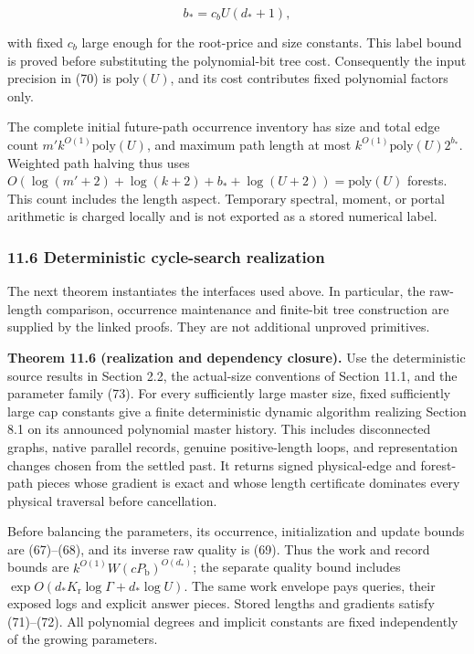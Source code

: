 \[
b_*=c_b U(d_*+1),
 \tag{72}
\]

with fixed \(c_b\) large enough for the root-price and size constants. This label bound is proved before substituting the polynomial-bit tree cost. Consequently the input precision in (70) is \(\mathrm{poly}(U)\), and its cost contributes fixed polynomial factors only.

The complete initial future-path occurrence inventory has size and total edge count \(m'k^{O(1)}\mathrm{poly}(U)\), and maximum path length at most \(k^{O(1)}\mathrm{poly}(U)2^{b_*}\). Weighted path halving thus uses \(O(\log(m'+2)+\log(k+2)+b_*+\log(U+2))=\mathrm{poly}(U)\) forests. This count includes the length aspect. Temporary spectral, moment, or portal arithmetic is charged locally and is not exported as a stored numerical label.

\hypertarget{af-46593eb93e-deterministic-cycle-search-realization}{%
\subsubsection{11.6 Deterministic cycle-search realization}\label{af-46593eb93e-deterministic-cycle-search-realization}}

The next theorem instantiates the interfaces used above. In particular, the raw-length comparison, occurrence maintenance and finite-bit tree construction are supplied by the linked proofs. They are not additional unproved primitives.

\textbf{Theorem 11.6 (realization and dependency closure).} Use the deterministic source results in Section 2.2, the actual-size conventions of Section 11.1, and the parameter family (73). For every sufficiently large master size, fixed sufficiently large cap constants give a finite deterministic dynamic algorithm realizing Section 8.1 on its announced polynomial master history. This includes disconnected graphs, native parallel records, genuine positive-length loops, and representation changes chosen from the settled past. It returns signed physical-edge and forest-path pieces whose gradient is exact and whose length certificate dominates every physical traversal before cancellation.

Before balancing the parameters, its occurrence, initialization and update bounds are (67)--(68), and its inverse raw quality is (69). Thus the work and record bounds are \(k^{O(1)}W(cP_{\mathrm b})^{O(d_*)}\); the separate quality bound includes \(\exp O(d_*K_{\mathrm r}\log\Gamma+d_*\log U)\). The same work envelope pays queries, their exposed logs and explicit answer pieces. Stored lengths and gradients satisfy (71)--(72). All polynomial degrees and implicit constants are fixed independently of the growing parameters.

